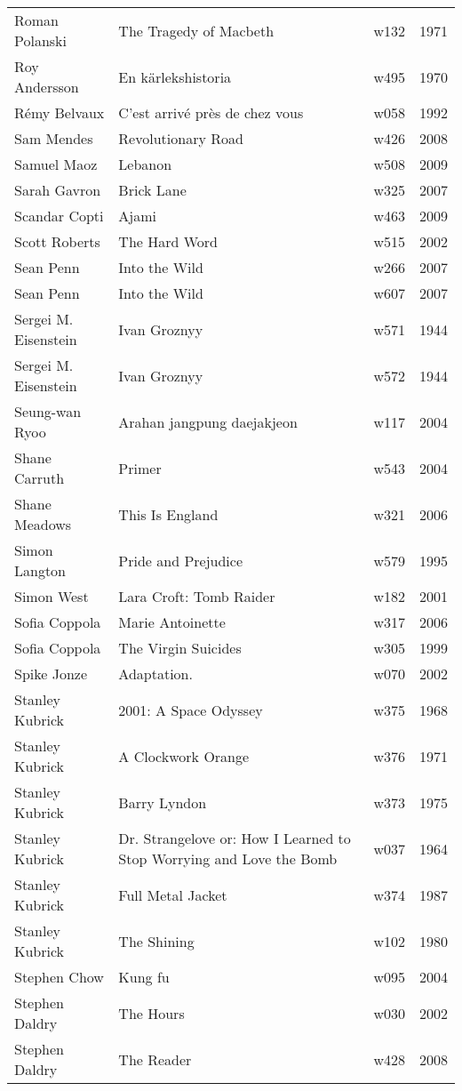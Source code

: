 \documentclass{article}
\begin{document}
\begin {center}
\begin{longtable}{l p{10cm} l l}
Roman Polanski & The Tragedy of Macbeth & w132 & 1971 \\
Roy Andersson & En kärlekshistoria & w495 & 1970 \\
Rémy Belvaux & C'est arrivé près de chez vous & w058 & 1992 \\
Sam Mendes & Revolutionary Road & w426 & 2008 \\
Samuel Maoz & Lebanon & w508 & 2009 \\
Sarah Gavron & Brick Lane & w325 & 2007 \\
Scandar Copti & Ajami & w463 & 2009 \\
Scott Roberts & The Hard Word & w515 & 2002 \\
Sean Penn & Into the Wild & w266 & 2007 \\
Sean Penn & Into the Wild & w607 & 2007 \\
Sergei M. Eisenstein & Ivan Groznyy & w571 & 1944 \\
Sergei M. Eisenstein & Ivan Groznyy & w572 & 1944 \\
Seung-wan Ryoo & Arahan jangpung daejakjeon & w117 & 2004 \\
Shane Carruth & Primer & w543 & 2004 \\
Shane Meadows & This Is England & w321 & 2006 \\
Simon Langton & Pride and Prejudice & w579 & 1995 \\
Simon West & Lara Croft: Tomb Raider & w182 & 2001 \\
Sofia Coppola & Marie Antoinette & w317 & 2006 \\
Sofia Coppola & The Virgin Suicides & w305 & 1999 \\
Spike Jonze & Adaptation. & w070 & 2002 \\
Stanley Kubrick & 2001: A Space Odyssey & w375 & 1968 \\
Stanley Kubrick & A Clockwork Orange & w376 & 1971 \\
Stanley Kubrick & Barry Lyndon & w373 & 1975 \\
Stanley Kubrick & Dr. Strangelove or: How I Learned to Stop Worrying and Love the Bomb & w037 & 1964 \\
Stanley Kubrick & Full Metal Jacket & w374 & 1987 \\
Stanley Kubrick & The Shining & w102 & 1980 \\
Stephen Chow & Kung fu & w095 & 2004 \\
Stephen Daldry & The Hours & w030 & 2002 \\
Stephen Daldry & The Reader & w428 & 2008 \\

\end{longtable}
\end{center}
\end{document}
